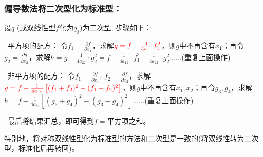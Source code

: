 \documentclass[zihao=5,UTF8]{report}
\theoremstyle{mystyle} %
\begin{document}
\subsubsection{偏导数法将二次型化为标准型：}
设$q$ (或双线性型$f$化为$q_f$)为二次型, 步骤如下：
\par
{}\ 平方项的配方：
令$f_1 = \frac{\partial f}{\partial x_1}$，求解$\textcolor{red}{g = f - \frac{1}{4a_{11}} f_1^2}$，则$g$中不再含有$x_1$；再令$g_2 = \frac{\partial g}{\partial x_2}$，求解$h = g - \frac{1}{4a_{22}}\cdot g_2^2 =f - \frac{1}{4a_{11}}\cdot f_1^2 - \frac{1}{4a_{22}}\cdot g_2^2$......(重复上面操作)   \par
{}\  非平方项的配方：
令$f_1 = \frac{\partial f}{\partial x_1},\  f_2 = \frac{\partial f}{\partial x_2}$，求解$\textcolor{red}{g = f - \frac{1}{4a_{12}}\left[ (f_1+f_2)^2 - (f_1-f_2)^2 \right]}$，则$g$中不再含有$x_1,x_2$；再令$ g_3,g_4 $，求解$h = f - \frac{1}{4a_{34}}\left[ (g_3+g_4)^2 - (g_3-g_4)^2 \right]$......(重复上面操作)
\par
{}\  最后将结果汇总，即可得到$f = $平方项之和。   \par


特别地，将对称双线性型化为标准型的方法和二次型是一致的(将双线性转为二次型，标准化后再转回)。
\end{document}
